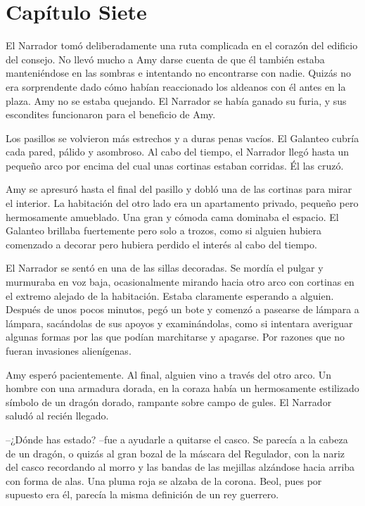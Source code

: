 \chapter*{Capítulo Siete}

{El Narrador tomó deliberadamente una ruta complicada en el corazón del
	edificio del consejo. No llevó mucho a Amy darse cuenta de que él
	también estaba manteniéndose en las sombras e intentando no encontrarse
	con nadie. Quizás no era sorprendente dado cómo habían reaccionado los
	aldeanos con él antes en la plaza. Amy no se estaba quejando. El
	Narrador se había ganado su furia, y sus escondites funcionaron para el
beneficio de Amy.}

{Los pasillos se volvieron más estrechos y a duras penas vacíos. El
	Galanteo cubría cada pared, pálido y asombroso. Al cabo del tiempo, el
	Narrador llegó hasta un pequeño arco por encima del cual unas cortinas
estaban corridas. Él las cruzó.}

{Amy se apresuró hasta el final del pasillo y dobló una de las cortinas
	para mirar el interior. La habitación del otro lado era un apartamento
	privado, pequeño pero hermosamente amueblado. Una gran y cómoda cama
	dominaba el espacio. El Galanteo brillaba fuertemente pero solo a
	trozos, como si alguien hubiera comenzado a decorar pero hubiera perdido
el interés al cabo del tiempo.}

{El Narrador se sentó en una de las sillas decoradas. Se mordía el
	pulgar y murmuraba en voz baja, ocasionalmente mirando hacia otro arco
	con cortinas en el extremo alejado de la habitación. Estaba claramente
	esperando a alguien. Después de unos pocos minutos, pegó un bote y
	comenzó a pasearse de lámpara a lámpara, sacándolas de sus apoyos y
	examinándolas, como si intentara averiguar algunas formas por las que
	podían marchitarse y apagarse. Por razones que no fueran invasiones
alienígenas.}

{Amy esperó pacientemente. Al final, alguien vino a través del otro
	arco. Un hombre con una armadura dorada, en la coraza había un
	hermosamente estilizado símbolo de un dragón dorado, rampante sobre
campo de gules. El Narrador saludó al recién llegado.}

{--¿Dónde has estado? --fue a ayudarle a quitarse el casco. Se parecía
	a la cabeza de un dragón, o quizás al gran bozal de la máscara del
	Regulador, con la nariz del casco recordando al morro y las bandas de
	las mejillas alzándose hacia arriba con forma de alas. Una pluma roja se
	alzaba de la corona. Beol, pues por supuesto era él, parecía la misma
definición de un rey guerrero.}

